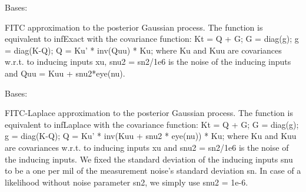 \documentclass[letterpaper,10pt,english]{sphinxmanual}
\begin{document}

\begin{fulllineitems}
\label{pyGPs.Core:pyGPs.Core.inf.FITC_Exact}
Bases: {\hyperref[Likelihoods:pyGPs.Core.inf.Inference]{}}

FITC approximation to the posterior Gaussian process. The function is
equivalent to infExact with the covariance function:
Kt = Q + G; G = diag(g); g = diag(K-Q);  Q = Ku' * inv(Quu) * Ku; 
where Ku and Kuu are covariances w.r.t. to inducing inputs xu, snu2 = sn2/1e6
is the noise of the inducing inputs and Quu = Kuu + snu2*eye(nu).

\begin{fulllineitems}
\label{pyGPs.Core:pyGPs.Core.inf.FITC_Exact.proceed}
\end{fulllineitems}


\end{fulllineitems}


\begin{fulllineitems}
\label{pyGPs.Core:pyGPs.Core.inf.FITC_Laplace}
Bases: {\hyperref[Likelihoods:pyGPs.Core.inf.Inference]{}}

FITC-Laplace approximation to the posterior Gaussian process. The function is
equivalent to infLaplace with the covariance function:
Kt = Q + G; G = diag(g); g = diag(K-Q);  Q = Ku' * inv(Kuu + snu2 * eye(nu)) * Ku;
where Ku and Kuu are covariances w.r.t. to inducing inputs xu and
snu2 = sn2/1e6 is the noise of the inducing inputs. We fixed the standard
deviation of the inducing inputs snu to be a one per mil of the measurement 
noise's standard deviation sn. In case of a likelihood without noise
parameter sn2, we simply use snu2 = 1e-6.

\begin{fulllineitems}
\label{pyGPs.Core:pyGPs.Core.inf.FITC_Laplace.proceed}
\end{fulllineitems}


\end{fulllineitems}
\end{document}
